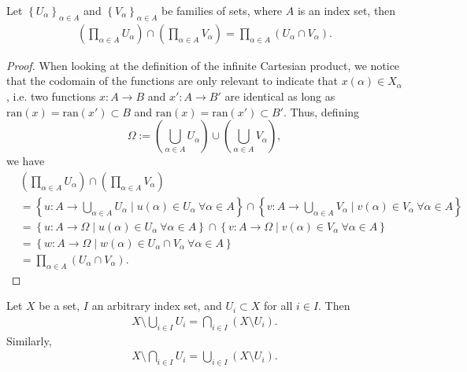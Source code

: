 \begin{theorem}\label{thrm:intersection_inf_Cart_prod}
	Let $\left\{U_{\alpha}\right\}_{\alpha\in A}$ and $\left\{V_{\alpha}\right\}_{\alpha\in A}$ be families of sets, where $A$ is an index set, then 
	\begin{align}\label{eq:intersection_inf_Cart_prod}
		\left(\prod_{\alpha\in A}U_{\alpha}\right) \cap \left(\prod_{\alpha\in A}V_{\alpha}\right) = \prod_{\alpha\in A}\left(U_{\alpha}\cap V_{\alpha}\right).
	\end{align}
\end{theorem}

\begin{proof}
	When looking at the definition of the infinite Cartesian product, we notice that the codomain of the functions are only relevant to indicate that $x(\alpha)\in X_{\alpha}$, i.e. two functions $x: A\to B$ and $x': A\to B'$ are identical as long as $\text{ran}(x) = \text{ran}(x') \subset B$ and $\text{ran}(x) = \text{ran}(x') \subset B'$. Thus, defining $$\Omega := \left(\bigcup_{\alpha\in A}U_{\alpha}\right)\cup \left(\bigcup_{\alpha\in A}V_{\alpha}\right),$$ we have
	\begin{align*}
		&\left(\prod_{\alpha\in A}U_{\alpha}\right) \cap \left(\prod_{\alpha\in A}V_{\alpha}\right) 
		\\ &= \left\{ u: A\to \bigcup_{\alpha\in A}U_{\alpha} \mid u(\alpha)\in U_{\alpha} \ \forall \alpha\in A\right\} \cap \left\{ v: A\to \bigcup_{\alpha\in A}V_{\alpha} \mid v(\alpha)\in V_{\alpha} \ \forall \alpha\in A\right\}
		\\ &= \left\{ u: A\to \Omega \mid u(\alpha)\in U_{\alpha}\ \forall\alpha\in A\right\} \cap \left\{ v: A\to \Omega \mid v(\alpha)\in V_{\alpha}\ \forall\alpha\in A\right\}
		\\ &= \left\{ w: A\to\Omega \mid w(\alpha)\in U_{\alpha}\cap V_{\alpha}\ \forall\alpha\in A 
		\right\}
		\\ &= \prod_{\alpha\in A}(U_{\alpha}\cap V_{\alpha}).
	\end{align*}
\end{proof}

\begin{theorem}\label{thrm:de_morgans_law}
	Let $X$ be a set, $I$ an arbitrary index set, and $U_i\subset X$ for all $i\in I$. Then 
	\begin{align}\label{eq:de_morgan_comp_union}
		X\setminus\bigcup_{i\in I}U_i = \bigcap_{i\in I}\left(X\setminus U_i\right).
	\end{align}
	Similarly, 
	\begin{align}\label{eq:de_morgan_comp_intersec}
		X\setminus \bigcap_{i\in I}U_i = \bigcup_{i\in I}\left(X\setminus U_i\right).
	\end{align}
\end{theorem}

